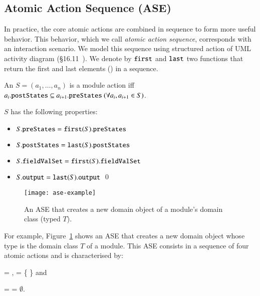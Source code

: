\subsection{Atomic Action Sequence (ASE)} \label{sect:arch-ase}
In practice, the core atomic actions are combined in sequence to form more useful behavior. This behavior, which we call \textit{atomic action sequence}, corresponds with an interaction scenario. We model this sequence using structured action of UML activity diagram (\S{16.11}~\cite{omg_unified_2015}).
%
We denote by $ \func{first}$ and $ \func{last}$ two functions that return the first and last elements (\resp) in a sequence.
%
\begin{definition} \label{def:ase}
An  $S = (a_1,\dots,a_n)$ is a module action iff $a_i.{\tt postStates} \subseteq a_{i+1}.{\tt preStates} ~(\forall a_i, a_{i+1} \in S)$.

$S$ has the following properties:
\begin{itemize}
\item $S.\membern{preStates} = \func{first}(S).\membern{preStates}$
\item $S.\membern{postStates} = \func{last}(S).\membern{postStates}$ 
\item $S.\membern{fieldValSet} = \func{first}(S).\membern{fieldValSet}$
\item $S.\membern{output} = \func{last}(S).\membern{output}$ \qed
\end{itemize}
\end{definition}

%
\begin{figure}[ht]
	\centering
	\texttt{[image: ase-example]}
	\caption{An ASE that creates a new domain object of a module's domain class (typed $T$).} %
	\label{fig:ase-example}
\end{figure}

For example, Figure~\ref{fig:ase-example} shows an ASE that creates a new domain object whose type is the domain class $T$ of a module. This ASE consists in a sequence of four atomic actions and is characterised by:

  = ,  = \{  \} and

  =  = $\emptyset$.

